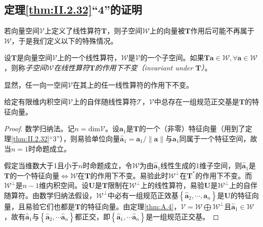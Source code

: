 \documentclass[main.tex]{subfiles}
\begin{document}
\subsection{定理\ref{thm:II.2.32}“4”的证明}
若向量空间$\mathcal{V}$上定义了线性算符$\mathbf{T}$，则子空间$\mathcal{W}$上的向量被$\mathbf{T}$作用后可能不再属于$\mathcal{W}$，于是我们定义以下的特殊情况。

\begin{definition}[子空间在线性算符的作用下不变]
    设$\mathbf{T}$是向量空间$\mathcal{V}$上的一个线性算符，$\mathcal{W}$是$\mathcal{V}$的一个子空间。如果$\mathbf{Ta}\in\mathcal{W},\forall\mathbf{a}\in\mathcal{W}$，则称\emph{子空间$\mathcal{W}$在线性算符$\mathbf{T}$的作用下不变（invariant under $\mathbf{T}$）}。
\end{definition}

显然，任一向一空间$\mathcal{V}$在其上的任一线性算符的作用下不变。

\begin{theorem}
    给定有限维内积空间$\mathcal{V}$上的自伴随线性算符$\mathcal{T}$，$\mathcal{V}$中总存在一组规范正交基是$\mathbf{T}$的特征向量。
\end{theorem}
\begin{proof}
    数学归纳法。记$n=\mathrm{dim}\mathcal{V}$。设$\mathbf{a}_1$是$\mathbf{T}$的一个（非零）特征向量（用到了定理\ref{thm:II.2.32}“3”），则易验单位向量$\mathbf{\hat{a}}_1=\mathbf{a}_1/\left\|\mathbf{a}\right\|$与$\mathbf{a}_1$同属于一个特征空间，故当$n=1$时命题成立。

    假定当维数大于1且小于$n$时命题成立，令$\mathcal{W}$为由$\mathbf{\hat{a}}_1$线性生成的1维子空间，则$\mathbf{\hat{a}}_1$是$\mathbf{T}$的一个特征向量$\Leftrightarrow\mathcal{W}$在$\mathbf{T}$的作用下不变。易验此时$\mathcal{W}^\perp$在$\mathbf{T}^*$的作用下不变。而$\mathcal{W}^\perp$是$n-1$维内积空间。设$\mathbf{U}$是$\mathbf{T}$限制在$\mathcal{W}^\perp$上的线性算符，易验$\mathbf{U}$是$\mathcal{W}^\perp$上的自伴随算符。由数学归纳法假设，$\mathcal{W}^\perp$中必有一组规范正效基$\left\{\mathbf{\hat{a}}_2,\cdots,\mathbf{a}_n\right\}$是$\mathbf{U}$的特征向量，且易验它们也都是$\mathbf{T}$的特征向量。由定理\ref{thm:A.4}，$\mathcal{V}=\mathcal{W}\bigoplus\mathcal{W}^\perp$且$\mathbf{\hat{a}}_1\in\mathcal{W}$，故有$\mathbf{\hat{a}}_1$与$\left\{\mathbf{\hat{a}}_2,\cdots\mathbf{\hat{a}}_n\right\}$都正交，即$\left\{\mathbf{\hat{a}}_1,\cdots\mathbf{\hat{a}}_n\right\}$是一组规范正交基。
\end{proof}
\end{document}
